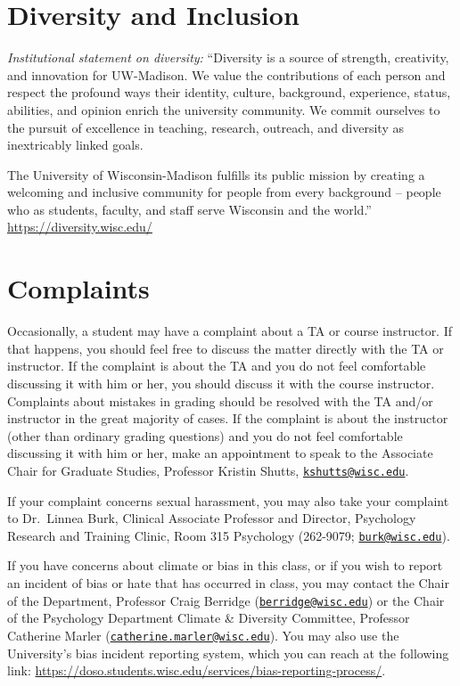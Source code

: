 \documentclass[11pt,man]{article}
\begin{document}
\hypertarget{diversity-and-inclusion}{%
\section{Diversity and Inclusion}\label{diversity-and-inclusion}}

\emph{Institutional statement on diversity:} ``Diversity is a source of
strength, creativity, and innovation for UW-Madison. We value the
contributions of each person and respect the profound ways their
identity, culture, background, experience, status, abilities, and
opinion enrich the university community. We commit ourselves to the
pursuit of excellence in teaching, research, outreach, and diversity as
inextricably linked goals.

The University of Wisconsin-Madison fulfills its public mission by
creating a welcoming and inclusive community for people from every
background -- people who as students, faculty, and staff serve Wisconsin
and the world.'' \url{https://diversity.wisc.edu/}

\hypertarget{complaints}{%
\section{Complaints}\label{complaints}}

Occasionally, a student may have a complaint about a TA or course
instructor. If that happens, you should feel free to discuss the matter
directly with the TA or instructor. If the complaint is about the TA and
you do not feel comfortable discussing it with him or her, you should
discuss it with the course instructor. Complaints about mistakes in
grading should be resolved with the TA and/or instructor in the great
majority of cases. If the complaint is about the instructor (other than
ordinary grading questions) and you do not feel comfortable discussing
it with him or her, make an appointment to speak to the Associate Chair
for Graduate Studies, Professor Kristin Shutts,
\href{mailto:kshutts@wisc.edu}{\nolinkurl{kshutts@wisc.edu}}.

If your complaint concerns sexual harassment, you may also take your
complaint to Dr.~Linnea Burk, Clinical Associate Professor and Director,
Psychology Research and Training Clinic, Room 315 Psychology (262-9079;
\href{mailto:burk@wisc.edu}{\nolinkurl{burk@wisc.edu}}).

If you have concerns about climate or bias in this class, or if you wish
to report an incident of bias or hate that has occurred in class, you
may contact the Chair of the Department, Professor Craig Berridge
(\href{mailto:berridge@wisc.edu}{\nolinkurl{berridge@wisc.edu}}) or the
Chair of the Psychology Department Climate \& Diversity Committee,
Professor Catherine Marler
(\href{mailto:catherine.marler@wisc.edu}{\nolinkurl{catherine.marler@wisc.edu}}).
You may also use the University's bias incident reporting system, which
you can reach at the following link:
\url{https://doso.students.wisc.edu/services/bias-reporting-process/}.
\end{document}
